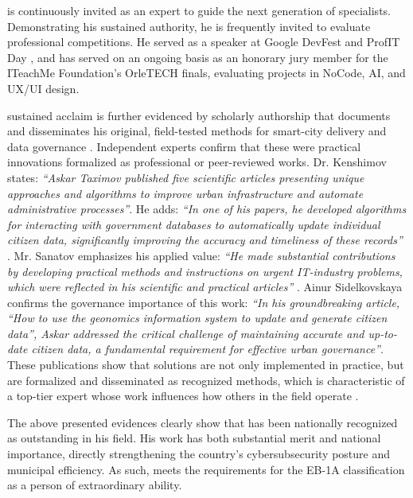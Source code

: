 \mrl{} is continuously invited as an expert to guide the next generation of specialists. Demonstrating his sustained authority, he is frequently invited to evaluate professional competitions. He served as a speaker at Google DevFest  and ProfIT Day , and has served on an ongoing basis as an honorary jury member for the ITeachMe Foundation’s OrleTECH finals, evaluating projects in NoCode, AI, and UX/UI design. 


\mrls sustained acclaim is further evidenced by scholarly authorship that documents and disseminates his original, field-tested methods for smart-city delivery and data governance . Independent experts confirm that these were practical innovations formalized as professional or peer-reviewed works. Dr. Kenshimov states: \emph{``Askar Taximov published five scientific articles presenting unique approaches and algorithms to improve urban infrastructure and automate administrative processes''}. He adds: \emph{``In one of his papers, he developed algorithms for interacting with government databases to automatically update individual citizen data, significantly improving the accuracy and timeliness of these records''} . Mr. Sanatov emphasizes his applied value: \emph{``He made substantial contributions by developing practical methods and instructions on urgent IT-industry problems, which were reflected in his scientific and practical articles''} . Ainur Sidelkovskaya confirms the governance importance of this work: \emph{``In his groundbreaking article, ``How to use the geonomics information system to update and generate citizen data'', Askar addressed the critical challenge of maintaining accurate and up-to-date citizen data, a fundamental requirement for effective urban governance''}. These publications show that \mrls solutions are not only implemented in practice, but are formalized and disseminated as recognized methods, which is characteristic of a top-tier expert whose work influences how others in the field operate .

\bigskip

The above presented evidences clearly show that \mrl{} has been nationally recognized as outstanding in his field. His work has both substantial merit and national importance, directly strengthening the country’s cybersubsecurity posture and municipal efficiency. As such, \mrl{} meets the requirements for the EB-1A classification as a person of extraordinary ability.

